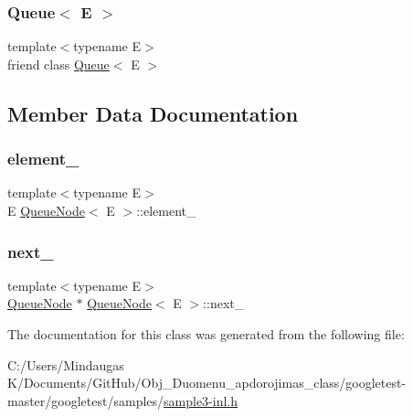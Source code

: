 \subsubsection{\texorpdfstring{Queue$<$ E $>$}{Queue< E >}}
{\footnotesize\ttfamily template$<$typename E$>$ \\
friend class \mbox{\hyperlink{class_queue}{Queue}}$<$ E $>$\hspace{0.3cm}{\ttfamily [friend]}}



\subsection{Member Data Documentation}
\mbox{\label{class_queue_node_a593f0f5862848c1e9063d32ea3438b58}} 
\subsubsection{\texorpdfstring{element\_}{element\_}}
{\footnotesize\ttfamily template$<$typename E$>$ \\
E \mbox{\hyperlink{class_queue_node}{Queue\+Node}}$<$ E $>$\+::element\+\_\+\hspace{0.3cm}{\ttfamily [private]}}

\mbox{\label{class_queue_node_aa1fc000fc7f7a83697cef9bd3ab89af7}} 
\subsubsection{\texorpdfstring{next\_}{next\_}}
{\footnotesize\ttfamily template$<$typename E$>$ \\
\mbox{\hyperlink{class_queue_node}{Queue\+Node}} $\ast$ \mbox{\hyperlink{class_queue_node}{Queue\+Node}}$<$ E $>$\+::next\+\_\+\hspace{0.3cm}{\ttfamily [private]}}



The documentation for this class was generated from the following file\+:\begin{DoxyCompactItemize}
\item 
C\+:/\+Users/\+Mindaugas K/\+Documents/\+Git\+Hub/\+Obj\+\_\+\+Duomenu\+\_\+apdorojimas\+\_\+class/googletest-\/master/googletest/samples/\mbox{\hyperlink{googletest-master_2googletest_2samples_2sample3-inl_8h}{sample3-\/inl.\+h}}\end{DoxyCompactItemize}
